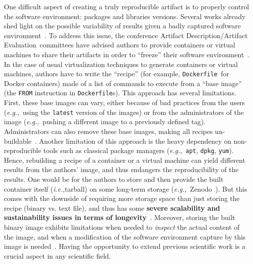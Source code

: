 \documentclass[sigconf,natbib=false]{acmart}
\newcommand{\ie}{\emph{i.e.,}}
\newcommand{\eg}{\emph{e.g.,}}
\newcommand{\ad}{Artifact Description}
\newcommand{\aeval}{Artifact Evaluation}
\newcommand{\adae}{\ad/\aeval}
\newcommand{\df}{\texttt{Dockerfile}}
\newcommand{\todo}[1]{{\color{red}{TODO: #1}}}
\begin{document}
One difficult aspect of creating a truly reproducible artifact is to properly control the software environment: packages and libraries versions.
Several works already shed light on the possible variability of results given a badly captured software environment~\cite{mytkowicz_producing_nodate, sokolowski2024impact}.
To address this issue, the conference \adae\ committees have advised authors to provide containers or virtual machines to share their artifacts in order to ``freeze'' their software environment~\cite{eurosys25, aetips, csartifacts}.
In the case of usual virtualization techniques to generate containers or virtual machines, authors have to write the ``recipe'' (for example, \df\ for Docker containers) made of a list of commands to execute from a ``base image'' (the \texttt{FROM} instruction in \df s).
This approach has several limitations.
First, these base images can vary, either because of bad practices from the users (\eg\ using the \texttt{latest} version of the images) or from the administrators of the image (\eg\ pushing a different image to a previously defined tag).
Administrators can also remove these base images, making all recipes un-buildable~\cite{nvidia_cuda_lifetime}.
Another limitation of this approach is the heavy dependency on non-reproducible tools such as classical package managers (\eg\ \texttt{apt}, \texttt{dpkg}, \texttt{yum}).
Hence, rebuilding a recipe of a container or a virtual machine can yield different results from the authors' image, and thus endangers the reproducibility of the results.
One would be for the authors to store and then provide the built container itself (\ie tarball) on some long-term storage (\eg\ Zenodo~\cite{zenodo}).
But this comes with the downside of requiring more storage space than just storing the recipe (binary vs. text file), and thus has some \textbf{severe scalability and sustainability issues in terms of longevity}~\cite{monroe2023preservation, guilloteau2024longevity}.
Moreover, storing the built binary image exhibits limitations when needed to \emph{inspect} the actual content of the image, and when a modification of the software environment capture by this image is needed~\cite{mercier2018considering}.
Having the opportunity to extend previous scientific work is a crucial aspect in any scientific field.


\end{document}

